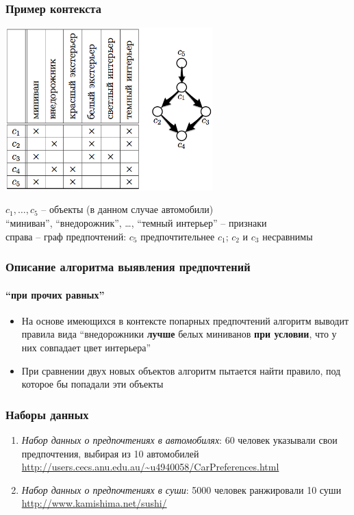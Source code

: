 \documentclass[xcolor=table,handout]{beamer}
\theoremstyle{definition}
\begin{document}
	\begin{frame}
		\frametitle{Пример контекста}
		\begin{center}
		\includegraphics[width=80mm]{./images/context.png}
		\end{center}
		\vspace{-1.5ex}
		 $c_1, \dotsc, c_5$ – объекты (в данном случае автомобили) \\
		 ``миниван'', ``внедорожник'', \dots, ``темный интерьер'' – признаки \\
		 \vspace{1ex}
		 справа – граф предпочтений: $c_5$ предпочтительнее $c_1$; $c_2$ и $c_3$ несравнимы
	\end{frame}
	
	\begin{frame}
		\frametitle{Описание алгоритма выявления предпочтений}
		\framesubtitle{\enquote{при прочих равных}}
		
		\begin{itemize}
			\item На основе имеющихся в контексте попарных предпочтений алгоритм выводит правила вида ``внедорожники \textbf{лучше} белых миниванов \textbf{при условии}, что у них совпадает цвет интерьера''
			\item При сравнении двух новых объектов алгоритм пытается найти правило, под которое бы попадали эти объекты
		\end{itemize}
		
	\end{frame}
	
	\begin{frame}
		\frametitle{Наборы данных}
		\begin{enumerate}
			\item \emph{Набор данных о предпочтениях в автомобилях}: 60 человек указывали свои предпочтения, выбирая из 10 автомобилей \cite{dataset:Abbasnejad:2013} \\
			\url{http://users.cecs.anu.edu.au/~u4940058/CarPreferences.html}
			\vspace{1em}
			\item \emph{Набор данных о предпочтениях в суши}: 5000 человек ранжировали 10 суши \cite{Kamishima:2003}
			\url{http://www.kamishima.net/sushi/}
		\end{enumerate}
	\end{frame}
	
\end{document}
